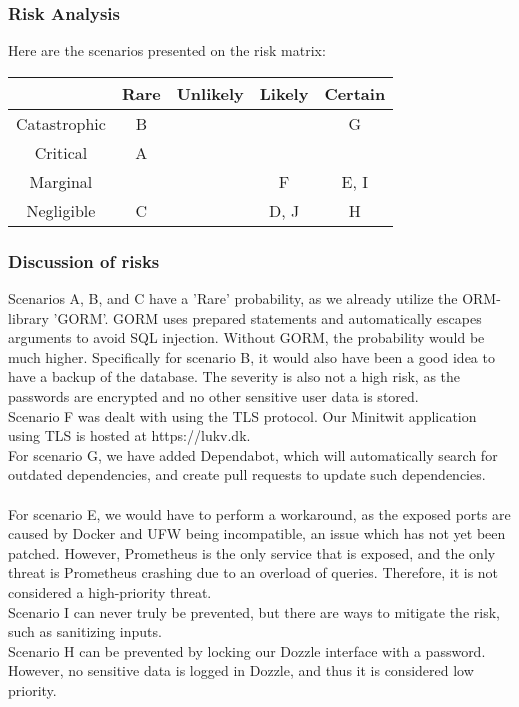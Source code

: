 \subsubsection{Risk Analysis}
Here are the scenarios presented on the risk matrix:
\begin{center}
\begin{tabular}{ |c|c|c|c|c| } 
 \hline
  & Rare & Unlikely & Likely & Certain \\ 
 \hline
 Catastrophic & B &  &  & G\\ 
 \hline
 Critical & A &  &  & \\ 
 \hline
 Marginal & &  &  F& E, I\\ 
 \hline
 Negligible & C &  & D, J & H\\ 
 \hline
\end{tabular}
\end{center}
\subsubsection{Discussion of risks}
Scenarios A, B, and C have a 'Rare' probability, as we already utilize the ORM-library 'GORM'. GORM uses prepared statements and automatically escapes arguments to avoid SQL injection. Without GORM, the probability would be much higher. Specifically for scenario B, it would also have been a good idea to have a backup of the database. The severity is also not a high risk, as the passwords are encrypted and no other sensitive user data is stored.\\
Scenario F was dealt with using the TLS protocol. Our Minitwit application using TLS is hosted at https://lukv.dk.\\
For scenario G, we have added Dependabot, which will automatically search for outdated dependencies, and create pull requests to update such dependencies.
\\\\
For scenario E, we would have to perform a workaround, as the exposed ports are caused by Docker and UFW being incompatible, an issue which has not yet been patched. However, Prometheus is the only service that is exposed, and the only threat is Prometheus crashing due to an overload of queries. Therefore, it is not considered a high-priority threat.\\
Scenario I can never truly be prevented, but there are ways to mitigate the risk, such as sanitizing inputs. 
\\
Scenario H can be prevented by locking our Dozzle interface with a password. However, no sensitive data is logged in Dozzle, and thus it is considered low priority.